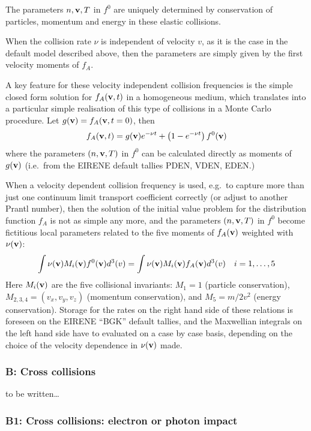 The parameters $n, \mathbf{v}, T$ in $f^0$ are uniquely determined by conservation of
particles, momentum and energy in these elastic collisions.

When the collision rate $\nu$ is independent of velocity $v$, as it is the case
in the default model described above, then the parameters are simply given by
the first velocity moments of $f_A$.

A key feature for these velocity independent collision frequencies is the
simple closed form solution for $f_A(\mathbf{v},t)$ in a homogeneous medium, which
translates into a particular simple realisation of this type of collisions in a
Monte Carlo procedure.
Let $g(\mathbf{v})=f_A(\mathbf{v},t=0)$, then
\begin{equation}
  f_A(\mathbf{v},t)=g(\mathbf{v})e^{-\nu t}
  +\left(1-e^{-\nu t}\right) f^0(\mathbf{v})
\end{equation}
where the parameters $(n,
  \mathbf{v}, T)$ in $f^0$ can be calculated directly as moments of $g(\mathbf{v})$ (i.e.\ from
the EIRENE default tallies PDEN, VDEN, EDEN.)

When a velocity dependent collision frequency is used, e.g.\ to capture more
than just one continuum limit transport coefficient correctly (or adjust to
another Prantl number), then the solution of the initial value problem for the
distribution function $f_A$ is not as simple any more, and the parameters $(n,
  \mathbf{v}, T)$ in $f^0$ become fictitious local parameters related to the five
moments of $f_A(\mathbf{v})$ weighted with $\nu(\mathbf{v})$:
\begin{equation}
  \int \nu(\mathbf{v}) M_i(\mathbf{v}) f^0(\mathbf{v}) d^3(v) = \int \nu(\mathbf{v}) M_i(\mathbf{v}) f_A(\mathbf{v})
  d^3(v) \ \ \ i=1, \dots, 5
\end{equation}
Here $M_i(\mathbf{v})$ are the five collisional invariants: $M_1 = 1$ (particle
conservation), $M_{2,3,4} = (v_x,v_y,v_z)$ (momentum conservation), and $M_5 =
  m/2 v^2$ (energy conservation).
Storage for the rates on the right hand side of these relations is foreseen on
the EIRENE ``BGK'' default tallies, and the Maxwellian integrals on the left
hand side have to evaluated on a case by case basis, depending on the choice of
the velocity dependence in $\nu(\mathbf{v})$ made.

\subsubsection{B: Cross collisions}

to be written\dots

\subsubsection{B1: Cross collisions: electron or photon impact}


